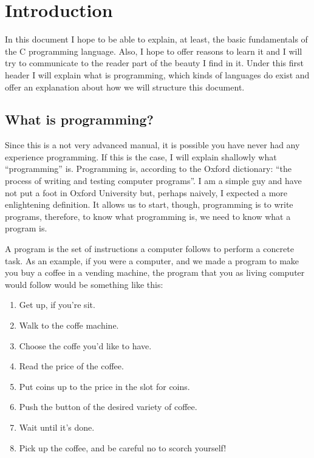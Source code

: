 \documentclass[a4paper]{article}
\begin{document}
\section{Introduction}
In this document I hope to be able to explain, at least, the basic fundamentals
of the C programming language. Also, I hope to offer reasons to learn it and
I will try to communicate to the reader part of the beauty I find in it.
Under this first header I will explain what is programming, which kinds
of languages do exist and offer an explanation about how we will structure this
document.

\label{section:queEsLaProgramacion}
\subsection{What is programming?}
Since this is a not very advanced manual, it is possible you have never had any
experience programming. If this is the case, I will explain shallowly what
``programming'' is. Programming is, according to the Oxford dictionary: ``the
process of writing and testing computer programs''. I am a simple guy and
have not put a foot in Oxford University but, perhaps naively, I expected a more
enlightening definition. It allows us to start, though, programming is to write
programs, therefore, to know what programming is, we need to know what a program
is.

A program is the set of instructions a computer follows to perform a
concrete task. As an example, if you were a computer, and we made a program to
make you buy a coffee in a vending machine, the program that you as living
computer would follow would be something like this:

\begin{enumerate}
    \item Get up, if you're sit.
    \item Walk to the coffe machine.
    \item Choose the coffe you'd like to have.
    \item Read the price of the coffee.
    \item Put coins up to the price in the slot for coins.
    \item Push the button of the desired variety of coffee.
    \item Wait until it's done.
    \item Pick up the coffee, and be careful no to scorch yourself!
\end{enumerate}
\end{document}

